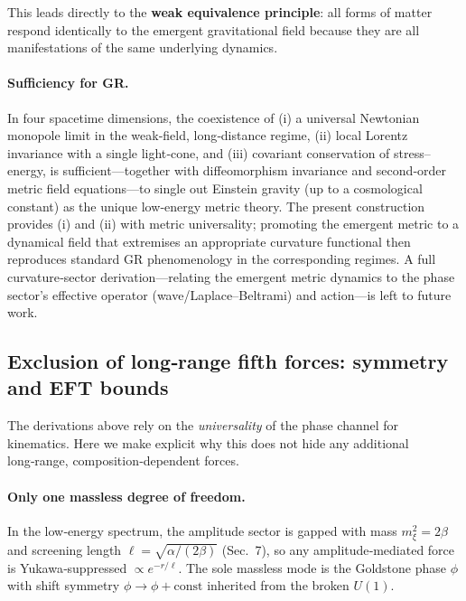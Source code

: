 \documentclass[11pt]{article}
\begin{document}
This leads directly to the \textbf{weak equivalence principle}: all forms of matter respond identically to the emergent gravitational field because they are all manifestations of the same underlying dynamics.

\paragraph{Sufficiency for GR.} In four spacetime dimensions, the coexistence of (i) a universal Newtonian monopole limit in the weak‑field, long‑distance regime, (ii) local Lorentz invariance with a single light‑cone, and (iii) covariant conservation of stress–energy, is sufficient—together with diffeomorphism invariance and second‑order metric field equations—to single out Einstein gravity (up to a cosmological constant) as the unique low‑energy metric theory. The present construction provides (i) and (ii) with metric universality; promoting the emergent metric to a dynamical field that extremises an appropriate curvature functional then reproduces standard GR phenomenology in the corresponding regimes. A full curvature‑sector derivation—relating the emergent metric dynamics to the phase sector's effective operator (wave/Laplace–Beltrami) and action—is left to future work.

\subsection{Exclusion of long‑range fifth forces: symmetry and EFT bounds}
\label{sec:no-fifth-forces}

The derivations above rely on the \emph{universality} of the phase channel for kinematics. Here we make explicit why this does not hide any additional long‑range, composition‑dependent forces.

\paragraph{Only one massless degree of freedom.} In the low‑energy spectrum, the amplitude sector is gapped with mass $m_\xi^2=2\beta$ and screening length $\ell=\sqrt{\alpha/(2\beta)}$ (Sec.~7), so any amplitude‑mediated force is Yukawa‑suppressed $\propto e^{-r/\ell}$. The sole massless mode is the Goldstone phase $\phi$ with shift symmetry $\phi\to \phi+\mathrm{const}$ inherited from the broken $U(1)$.
\end{document}
